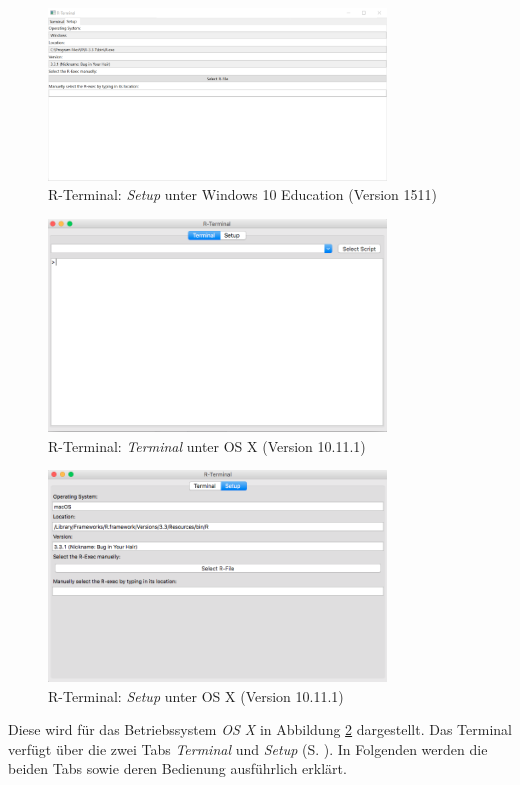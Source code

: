 \documentclass[a4paper, 12pt]{report} %
\begin{document}
\begin{figure}[htpb]
\centering
\includegraphics[width=0.8\textwidth]{Bilder/R-TerminalWindows}
\caption{R-Terminal: \textit{Setup} unter Windows 10 Education (Version 1511)}
\label{rterminalwindows}
\end{figure}

\begin{figure}[htpb]
\centering
\includegraphics[width=0.8\textwidth]{Bilder/R-Terminal}
\caption{R-Terminal: \textit{Terminal} unter OS X (Version 10.11.1)}
\label{rterminalmac}
\end{figure}

\begin{figure}[htpb]
\centering
\includegraphics[width=0.8\textwidth]{Bilder/rterminalsetup}
\caption{R-Terminal: \textit{Setup} unter OS X (Version 10.11.1)}
\label{macsetup}
\end{figure}
Diese wird für das Betriebssystem \textit{OS X} in Abbildung \ref{rterminalmac} dargestellt. Das Terminal verfügt über die zwei Tabs \textit{Terminal} und \textit{Setup} (S. \pageref{macsetup}). In Folgenden werden die beiden Tabs sowie deren Bedienung ausführlich erklärt.
\end{document}
